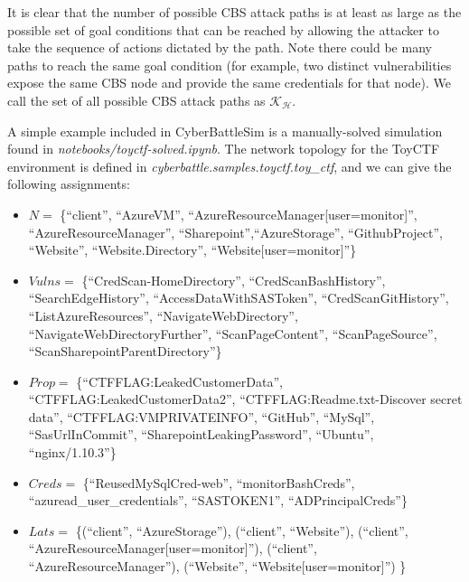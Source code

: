 
It is clear that the number of possible CBS attack paths is at least as large as the possible set of goal conditions that can be reached by allowing the attacker to take the sequence of actions dictated by the path. Note there could be many paths to reach the same goal condition (for example, two distinct vulnerabilities expose the same CBS node and provide the same credentials for that node). We call the set of all possible CBS attack paths as $\mathcal{K}_{\mathcal{H}}$.


\begin{mdframed}
\begin{example}
\label{ex:attackpath}

A simple example included in CyberBattleSim is a manually-solved simulation found in \textit{notebooks/toyctf-solved.ipynb}. The network topology for the ToyCTF environment is defined in \textit{cyberbattle.samples.toyctf.toy\_ctf}, and we can give the following assignments:
\begin{itemize}
    \item $N = $ \{``client'', ``AzureVM'', ``AzureResourceManager[user=monitor]'', ``AzureResourceManager'', ``Sharepoint'',``AzureStorage'', ``GithubProject'', ``Website'', ``Website.Directory'', ``Website[user=monitor]''\}
    \item $Vulns =$ \{``CredScan-HomeDirectory'', ``CredScanBashHistory'', ``SearchEdgeHistory'', ``AccessDataWithSASToken'', ``CredScanGitHistory'', ``ListAzureResources'', ``NavigateWebDirectory'', ``NavigateWebDirectoryFurther'', ``ScanPageContent'', ``ScanPageSource'', ``ScanSharepointParentDirectory''\}
    \item $Prop =$ \{``CTFFLAG:LeakedCustomerData'', ``CTFFLAG:LeakedCustomerData2'', ``CTFFLAG:Readme.txt-Discover secret data'', ``CTFFLAG:VMPRIVATEINFO'', ``GitHub'', ``MySql'', ``SasUrlInCommit'', ``SharepointLeakingPassword'', ``Ubuntu'', ``nginx/1.10.3''\}
    \item $Creds =$ \{``ReusedMySqlCred-web'',  ``monitorBashCreds'', ``azuread\_user\_credentials'', ``SASTOKEN1'', ``ADPrincipalCreds''\}
    \item $Lats =$ \{(``client'', ``AzureStorage''), (``client'', ``Website''), (``client'', ``AzureResourceManager[user=monitor]''), (``client'', ``AzureResourceManager''), (``Website'', ``Website[user=monitor]'') \}
\end{itemize}



\end{example}
\end{mdframed}
